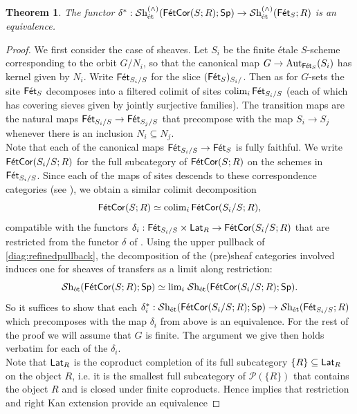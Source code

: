 \documentclass[reqno]{amsart}
\numberwithin{equation}{section}\theoremstyle{thms}
\newtheorem{thm}[equation]{Theorem}
\theoremstyle{defn}
\newcommand{\cP}{\mathcal{P}}
\newcommand{\tn}[1]{\textnormal{#1}}
\newcommand{\tsf}[1]{\textsf{\textup{#1}}}
\newcommand{\mcal}[1]{\mathcal{#1}}
\newcommand{\sheaves}{\mcal{S}\tn{h}}
\newcommand{\spec}{\tsf{Sp}}
\newcommand{\fets}{\tsf{Fét}_S}
\newcommand{\fetslice}[1]{\tsf{Fét}_{{#1}/S}}
\newcommand{\corfets}[1]{\tsf{FétCor}(S;#1)}
\newcommand{\corfetsslice}[2]{\tsf{FétCor}({#2}/S;#1)}
\newcommand{\lat}{\tsf{Lat}}
\begin{document}
\begin{thm}\label{thm:etaletransfers}
The functor $\delta^*: \sheaves_{\tn{ét}}^{(\wedge)}(\corfets{R};\spec) \to \sheaves_{\tn{ét}}^{(\wedge)}(\fets;R)$ is an equivalence.
\end{thm}
\begin{proof}
We first consider the case of sheaves. Let $S_i$ be the finite étale $S$-scheme corresponding to the orbit $G/N_i$, so that the canonical map $G \to \tn{Aut}_{\fets}(S_i) $ has kernel given by $N_i$. Write $\fetslice{S_i}$ for the slice $(\fets)_{S_i/}$. Then as for $G$-sets \cite[Construction 4.5]{cm21} the site $\fets$ decomposes into a filtered colimit of sites $\tn{colim}_i \, \fetslice{S_i}$ (each of which has covering sieves given by jointly surjective families). The transition maps are the natural maps $\fetslice{S_i} \to \fetslice{S_j}$ that precompose with the map $S_i \to S_j$ whenever there is an inclusion $N_i \subseteq N_j$. \\
Note that each of the canonical maps $\fetslice{S_i} \to \fets$ is fully faithful. We write $\corfetsslice{R}{S_i}$ for the full subcategory of $\corfets{R}$ on the schemes in $\fetslice{S_i}$. Since each of the maps of sites descends to these correspondence categories (see ), we obtain a similar colimit decomposition 
$$\corfets{R} \simeq \tn{colim}_i \, \corfetsslice{R}{S_i},$$
compatible with the functors $\delta_i: \fetslice{S_i} \times \lat_R \to \corfetsslice{R}{S_i}$ that are restricted from the functor $\delta$ of . Using the upper pullback of \ref{diag:refinedpullback}, the decomposition of the (pre)sheaf categories involved induces one for sheaves of transfers as a limit along restriction:
$$\sheaves_{\tn{ét}}(\corfets{R};\spec) \simeq \tn{lim}_i \; \sheaves_{\tn{ét}}(\corfetsslice{R}{S_i};\spec).$$
So it suffices to show that each $\delta_i^*: \sheaves_{\tn{ét}}(\corfetsslice{R}{S_i};\spec) \to \sheaves_{\tn{ét}}(\fetslice{S_i};R)$ which precomposes with the map $\delta_i$ from above is an equivalence. For the rest of the proof we will assume that $G$ is finite. The argument we give then holds verbatim for each of the $\delta_i$. \\
Note that $\lat_R$ is the coproduct completion of its full subcategory $\{R \} \subseteq \lat_R$ on the object $R$, i.e. it is the smallest full subcategory of $\cP(\{R \})$ that contains the object $R$ and is closed under finite coproducts. Hence \cite[Proposition 5.3.6.2]{lur09} implies that restriction and right Kan extension provide an equivalence

\end{proof}
\end{document}
